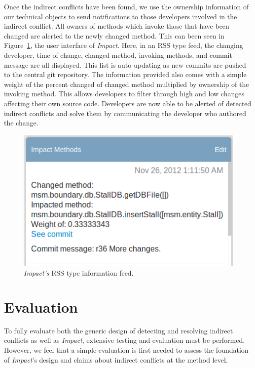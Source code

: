 \documentclass[conference]{IEEEtran}
\begin{document}
Once the indirect conflicts have been found, we use the
ownership information of our technical objects to send notifications to
those developers involved in the indirect conflict. All owners
of methods which invoke those that have been changed are alerted
to the newly changed method. This can been seen in
Figure~\ref{fig:impact}, the user interface of \textit{Impact}. Here, in an RSS type
feed, the changing developer, time of change, changed method,
invoking methods, and commit message are all displayed. This 
list is auto updating as new commits are pushed to the central
git repository. The information provided also comes with a simple
weight of the percent changed of changed method multiplied by 
ownership of the invoking method. This allows developers to filter
through high and low changes affecting their own source code.
Developers are now able to be alerted of detected indirect
conflicts and solve them by communicating the developer
who authored the change.

\begin{figure}[t!]
\includegraphics[width=\columnwidth]{images/ImpactDemo}
\caption{\textit{Impact's} RSS type information feed.\label{fig:impact}}
\end{figure}


\section{Evaluation}
To fully evaluate both the generic design of detecting and resolving
indirect conflicts as well as \textit{Impact}, extensive testing and evaluation
must be performed. However, we feel that a simple evaluation is
first needed to assess the foundation of \textit{Impact}'s design and claims
about indirect conflicts at the method level.
\end{document}
